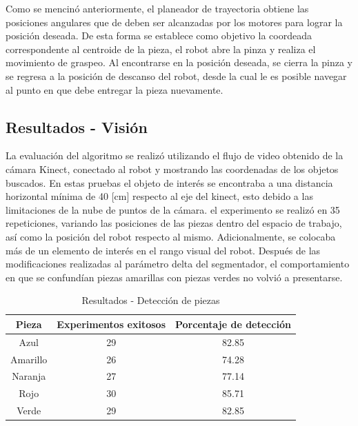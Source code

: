 Como se mencinó anteriormente, el planeador de trayectoria obtiene las posiciones angulares que de deben ser alcanzadas por los motores para lograr la posición deseada. De esta forma se establece como objetivo la coordeada correspondente al centroide de la pieza, el robot abre la pinza y realiza el movimiento de graspeo. Al encontrarse en la posición deseada, se cierra la pinza y se regresa a la posición de descanso del robot, desde la cual le es posible navegar al punto en que debe entregar la pieza nuevamente.

\subsection{Resultados - Visión}
La evaluación del algoritmo se realizó utilizando el flujo de video obtenido de la cámara Kinect, conectado al robot y mostrando las coordenadas de los objetos buscados. En estas pruebas el objeto de interés se encontraba a una distancia horizontal mínima de 40 [cm] respecto al eje del kinect, esto debido a las limitaciones de la nube de puntos de la cámara. el experimento se realizó en 35 repeticiones, variando las posiciones de las piezas dentro del espacio de trabajo, así como la posición del robot respecto al mismo. Adicionalmente, se colocaba más de un elemento de interés en el rango visual del robot. Después de las modificaciones realizadas al parámetro delta del segmentador, el comportamiento en que se confundían piezas amarillas con piezas verdes no volvió a presentarse.

\begin{table}
    \centering
    \begin{tabular}{|c|c|c|}
    \hline
        \textbf{Pieza} & \textbf{Experimentos exitosos} & \textbf{Porcentaje de detección}\\
    \hline
        Azul & 29 & 82.85\\
    \hline
        Amarillo & 26 & 74.28\\
    \hline
        Naranja & 27 & 77.14 \\
    \hline
        Rojo & 30 & 85.71 \\
    \hline
        Verde & 29 & 82.85 \\
    \hline
    \end{tabular}
    \caption{Resultados - Detección de piezas}
    \label{tab:Res-Vis}
\end{table}

\newpage

